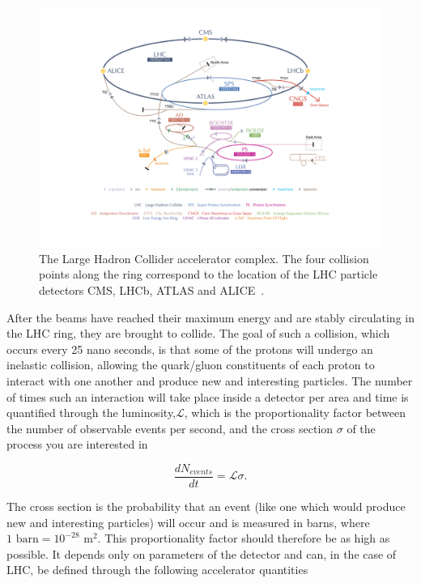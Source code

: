 \begin{figure}[h] 
    \centering
    \includegraphics[width=1.0\textwidth]{figures/cms/LHC.jpg}
    \caption{The Large Hadron Collider accelerator complex. The four collision points along the ring correspond to the location of the LHC particle detectors CMS, LHCb, ATLAS and ALICE~\cite{LHC}.}
    \label{fig:cms:LHC}
\end{figure}

After the beams have reached their maximum energy and are stably circulating in the LHC ring, they are brought to collide. The goal of such a collision, which occurs every 25 nano seconds, is that some of the protons will undergo an inelastic collision, allowing the quark/gluon constituents of each proton to interact with one another and produce new and interesting particles.
The number of times such an interaction will take place inside a detector per area and time is quantified through the luminosity,$\mathcal L$, which is the proportionality factor between the number of observable events per second, and the cross section $\sigma$ of the process you are interested in
 
\begin{equation}
  \frac{dN_{events}}{dt} =\mathcal L \sigma .
\end{equation}

The cross section is the probability that an event (like one which would produce new and interesting particles) will occur and is measured in barns, where $1 \textrm{ barn} = 10^{-28} \textrm{ m}^2$. This proportionality factor should therefore be as high as possible. It depends only on parameters of the detector and can, in the case of LHC, be defined through the following accelerator quantities

